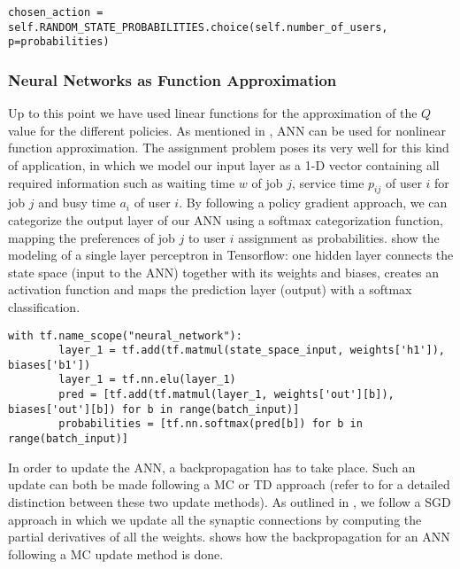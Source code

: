 \documentclass{seal_thesis}
\begin{document}
\begin{lstlisting}[caption=Probabilistic user choice,label=lst:prob_user_choice,style=CustomPython]
	chosen_action = self.RANDOM_STATE_PROBABILITIES.choice(self.number_of_users, p=probabilities)
\end{lstlisting}

\subsubsection{Neural Networks as Function Approximation}

Up to this point we have used linear functions for the approximation of the $Q$ value for the different policies. As mentioned in , ANN can be used for nonlinear function approximation. The assignment problem poses its very well for this kind of application, in which we model our input layer as a 1-D vector containing all required information such as waiting time $w$ of job $j$, service time $p_{ij}$ of user $i$ for job $j$ and busy time $a_i$ of user $i$. By following a policy gradient approach, we can categorize the output layer of our ANN using a softmax categorization function, mapping the preferences of job $j$ to user $i$ assignment as probabilities.  show the modeling of a single layer perceptron in Tensorflow: one hidden layer connects the state space (\ie input to the ANN) together with its weights and biases, creates an activation function and maps the prediction layer (\ie output) with a softmax classification.

\begin{lstlisting}[caption=Modeling of a single perceptron in Tensorflow,label=lst:ann_1h,style=CustomPython]
	with tf.name_scope("neural_network"):
    	layer_1 = tf.add(tf.matmul(state_space_input, weights['h1']), biases['b1'])
    	layer_1 = tf.nn.elu(layer_1)
    	pred = [tf.add(tf.matmul(layer_1, weights['out'][b]), biases['out'][b]) for b in range(batch_input)]
    	probabilities = [tf.nn.softmax(pred[b]) for b in range(batch_input)]
\end{lstlisting}

In order to update the ANN, a backpropagation has to take place. Such an update can both be made following a MC or TD approach (refer to  for a detailed distinction between these two update methods). As outlined in , we follow a SGD approach in which we update all the synaptic connections by computing the partial derivatives of all the weights.  shows how the backpropagation for an ANN following a MC update method is done.
\end{document}

